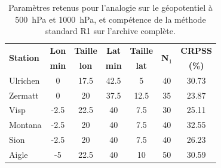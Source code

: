 \documentclass[hess]{copernicus}
\begin{document}
\begin{table}[htb]
	\caption{Paramètres retenus pour l'analogie sur le géopotentiel à 500~hPa et 1000~hPa, et compétence de la méthode standard R1 sur l'archive complète.}
	\begin{center}
		\begin{tabular}{l c c c c c c }
			\hline
			\multirow{2}{*}{\textbf{Station}} & \textbf{Lon} & \textbf{Taille} & \textbf{Lat} & \textbf{Taille} & \multirow{2}{*}{\textbf{N$_{1}$}} & \textbf{CRPSS} \\ 
			& \textbf{min} & \textbf{lon} & \textbf{min} & \textbf{lat} & & \textbf{(\%)} \\ 
			\hline
			Ulrichen & 0 & 17.5 & 42.5 & 5 & 40 & 30.73 \\ \hline
			Zermatt & 0 & 20 & 37.5 & 12.5 & 35 & 23.87 \\ \hline
			Visp & -2.5 & 22.5 & 40 & 7.5 & 30 & 25.11 \\ \hline
			Montana & -2.5 & 20 & 40 & 7.5 & 40 & 32.55 \\ \hline
			Sion & -2.5 & 20 & 40 & 7.5 & 40 & 26.23 \\ \hline
			Aigle & -5 & 22.5 & 40 & 10 & 50 & 30.59 \\ \hline
		\end{tabular}
	\end{center}
	\label{tab:fenetre_glissante:Resultats_R1_originaux}
\end{table}
\end{document}
